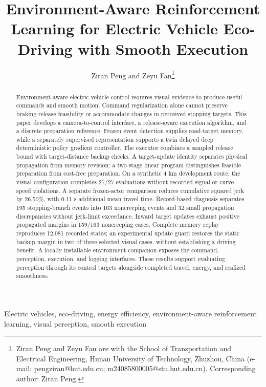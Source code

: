 \documentclass[letterpaper,journal]{IEEEtran}
\begin{document}
\title{Environment-Aware Reinforcement Learning for Electric Vehicle Eco-Driving with Smooth Execution}
\author{Ziran Peng and Zeyu Fan\thanks{Ziran Peng and Zeyu Fan are with the School of Transportation and Electrical Engineering, Hunan University of Technology, Zhuzhou, China (e-mail: pengziran@hut.edu.cn; m24085800005@stu.hut.edu.cn). Corresponding author: Ziran Peng.}}
\maketitle
\begin{abstract}Environment-aware electric vehicle control requires visual evidence to produce useful commands and smooth motion. Command regularization alone cannot preserve braking-release feasibility or accommodate changes in perceived stopping targets. This paper develops a camera-to-control interface, a release-aware execution algorithm, and a discrete preparation reference. Frozen event detection supplies road-target memory, while a separately supervised representation supports a twin delayed deep deterministic policy gradient controller. The executor combines a sampled release bound with target-distance backup checks. A target-update identity separates physical propagation from memory revision; a two-stage linear program distinguishes feasible preparation from cost-free preparation. On a synthetic 4 km development route, the visual configuration completes 27/27 evaluations without recorded signal or curve-speed violations. A separate frozen-actor comparison reduces cumulative squared jerk by 26.50\%, with 0.11 s additional mean travel time. Record-based diagnosis separates 195 stopping-branch events into 163 noncreeping events and 32 small propagation discrepancies without jerk-limit exceedance. Inward target updates exhaust positive propagated margins in 159/163 noncreeping cases. Complete memory replay reproduces 12,081 recorded states; an experimental update guard restores the static backup margin in two of three selected visual cases, without establishing a driving benefit. A locally installable environment companion exposes the command, perception, execution, and logging interfaces. These results support evaluating perception through its control targets alongside completed travel, energy, and realized smoothness.\end{abstract}
\begin{IEEEkeywords}Electric vehicles, eco-driving, energy efficiency, environment-aware reinforcement learning, visual perception, smooth execution\end{IEEEkeywords}
\end{document}
